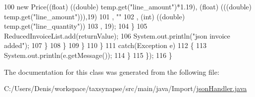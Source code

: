 \begin{DoxyCode}
100                                         \textcolor{keyword}{new} Price((\textcolor{keywordtype}{float}) ((\textcolor{keywordtype}{double}) temp.get(\textcolor{stringliteral}{"line\_amount"})*1.19), (float) 
      (((\textcolor{keywordtype}{double}) temp.get(\textcolor{stringliteral}{"line\_amount"}))),19)
101                                         , \textcolor{stringliteral}{""}
102                                         , (\textcolor{keywordtype}{int}) ((double) temp.get(\textcolor{stringliteral}{"line\_quantity"}))
103                                         , 19);                          
104                             \}
105                             ReducedInvoiceList.add(returnValue);
106                             System.out.println(\textcolor{stringliteral}{"json invoice added"});
107                         \}
108                     \}
109                 \}
110             \}
111             \textcolor{keywordflow}{catch}(Exception e)
112             \{
113                 System.out.println(e.getMessage());
114             \}
115         \});
116     \}
\end{DoxyCode}


The documentation for this class was generated from the following file\+:\begin{DoxyCompactItemize}
\item 
C\+:/\+Users/\+Denis/workspace/taxsynapse/src/main/java/\+Import/\hyperlink{json_handler_8java}{json\+Handler.\+java}\end{DoxyCompactItemize}
